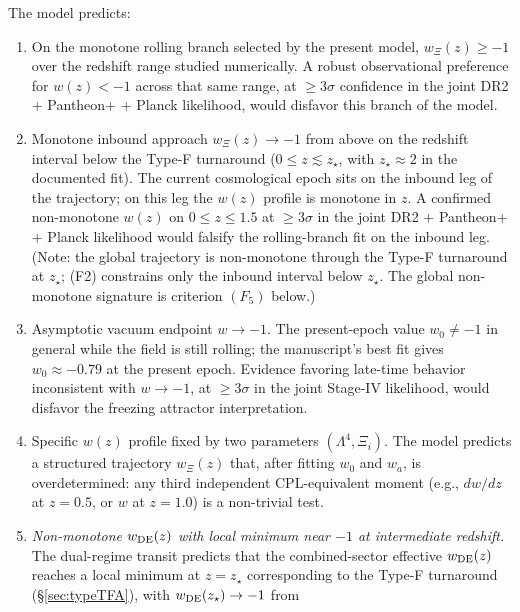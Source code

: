 \documentclass[11pt,reqno]{amsart}
\theoremstyle{plain}
\theoremstyle{definition}
\theoremstyle{remark}
\begin{document}
The model predicts:
\begin{enumerate}
  \item[(F1)] On the monotone rolling branch selected by the present
        model, $w_\Xi(z) \geq -1$ over the redshift range studied
        numerically. A robust observational preference for $w(z) < -1$
        across that same range, at $\geq 3\sigma$ confidence in the joint
        DR2 + Pantheon+ + Planck likelihood, would disfavor this branch
        of the model.
  \item[(F2)] Monotone inbound approach $w_\Xi(z) \to -1$ from above
        on the redshift interval below the Type-F turnaround
        ($0 \leq z \lesssim z_\star$, with $z_\star \approx 2$ in the
        documented fit). The current cosmological epoch sits on the
        inbound leg of the trajectory; on this leg the
        $w(z)$ profile is monotone in $z$. A confirmed non-monotone
        $w(z)$ on $0 \leq z \leq 1.5$ at $\geq 3\sigma$ in the joint
        DR2 + Pantheon+ + Planck likelihood would falsify the
        rolling-branch fit on the inbound leg. (Note: the global
        trajectory is non-monotone through the Type-F turnaround at
        $z_\star$; (F2) constrains only the inbound interval below
        $z_\star$. The global non-monotone signature is criterion
        $(F_5)$ below.)
  \item[(F3)] Asymptotic vacuum endpoint $w \to -1$. The present-epoch
        value $w_0 \neq -1$ in general while the field is still rolling;
        the manuscript's best fit gives $w_0 \approx -0.79$ at the present
        epoch. Evidence favoring late-time behavior inconsistent with
        $w \to -1$, at $\geq 3\sigma$ in the joint Stage-IV likelihood,
        would disfavor the freezing attractor interpretation.
  \item[(F4)] Specific $w(z)$ profile fixed by two parameters
        $(\Lambda^{4}, \Xi_i)$. The model predicts a structured
        trajectory $w_\Xi(z)$ that, after fitting $w_0$ and $w_a$, is
        overdetermined: any third independent CPL-equivalent moment
        (e.g., $dw/dz$ at $z=0.5$, or $w$ at $z=1.0$) is a non-trivial
        test.
  \item[(F5)] \emph{Non-monotone $w_{\rm DE}(z)$ with local minimum
        near $-1$ at intermediate redshift.}
        The dual-regime transit predicts that the combined-sector
        effective $w_{\rm DE}(z)$ reaches a local minimum at
        $z = z_\star$ corresponding to the Type-F turnaround
        (\S\ref{sec:typeTFA}), with $w_{\rm DE}(z_\star) \to -1$ from

\end{enumerate}
\end{document}
